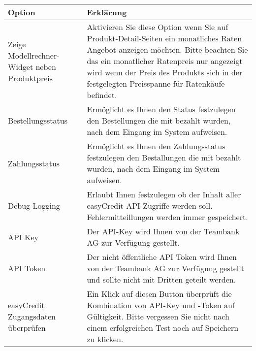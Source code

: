 \documentclass[a4paper,10pt,openany,oneside,ngerman]{sphinxmanual}
\begin{document}
\begin{savenotes}\sphinxattablestart
\centering
\begin{tabulary}{\linewidth}[t]{|p{85pt}|J|}
\hline

Option
&
Erklärung
\\
\hline
Zeige Modellrechner-Widget neben Produktpreis
&
Aktivieren Sie diese Option wenn Sie auf Produkt-Detail-Seiten ein monatliches Raten Angebot anzeigen möchten. Bitte beachten Sie das ein monatlicher Ratenpreis nur angezeigt wird wenn der Preis des Produkts sich in der festgelegten Preisspanne für Ratenkäufe befindet.
\\
\hline
Bestellungsstatus
&
Ermöglicht es Ihnen den Status festzulegen den Bestellungen die mit  bezahlt wurden, nach dem Eingang im System aufweisen.
\\
\hline
Zahlungsstatus
&
Ermöglicht es Ihnen den Zahlungsstatus festzulegen den Bestallungen die mit  bezahlt wurden, nach dem Eingang im System aufweisen.
\\
\hline
Debug Logging
&
Erlaubt Ihnen festzulegen ob der Inhalt aller easyCredit API-Zugriffe werden soll. Fehlermitteillungen werden immer gespeichert.
\\
\hline
API Key
&
Der API-Key wird Ihnen von der Teambank AG zur Verfügung gestellt.
\\
\hline
API Token
&
Der nicht öffentliche API Token wird Ihnen von der Teambank AG zur Verfügung gestellt und sollte nicht mit Dritten geteilt werden.
\\
\hline
easyCredit Zugangsdaten überprüfen
&
Ein Klick auf diesen Button überprüft die Kombination von API-Key und -Token auf Gültigkeit. Bitte vergessen Sie nicht nach einem erfolgreichen Test noch auf Speichern zu klicken.
\\
\hline
\end{tabulary}
\par
\sphinxattableend\end{savenotes}



\renewcommand{\indexname}{Stichwortverzeichnis}
\footnotesize\raggedright\printindex
\end{document}
